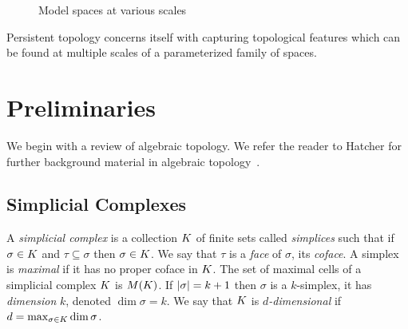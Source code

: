  \begin{figure}
\centering
 \hspace{.5cm}
 \hspace{.25cm}
 \hspace{.25cm}
\caption{Model spaces at various scales}
\end{figure}

Persistent topology concerns itself with capturing topological features which can be found at multiple scales of a parameterized family of spaces.

\section{Preliminaries}
We begin with a review of algebraic topology. We refer the reader to Hatcher for further background material in algebraic topology~\cite{hatcher}.
\subsection{Simplicial Complexes}
A \emph{simplicial complex} is a collection $K$ of finite sets called
\emph{simplices} such that if $\sigma \in K$ and $\tau \subseteq \sigma$ then 
$\sigma \in K$. We say that $\tau$ is a \emph{face} of $\sigma$, its \emph{coface}. A simplex
is \emph{maximal} if it has no proper coface in $K$. The set of maximal cells of a 
simplicial complex $K$ is $M(K)$. If $|\sigma| = k+1$
then $\sigma$ is a $k$-simplex, it has \emph{dimension} $k$, denoted 
$\dim{\sigma} = k$. We say that $K$ is \emph{$d$-dimensional} if 
$d = \max_{\sigma \in K} \dim{\sigma}$. 

